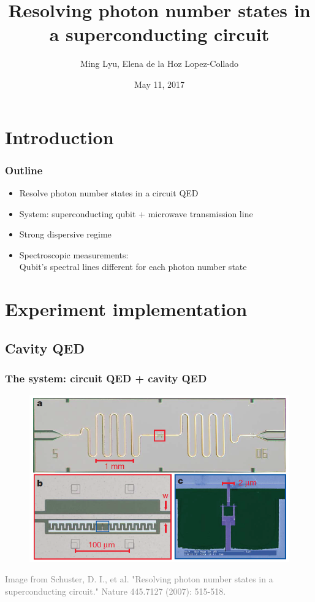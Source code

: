 \documentclass[xcolor=dvipsnames,hyperref={CJKbookmarks=true},aspectratio=169]{beamer}
\title[Nature 445, 515-518]{Resolving photon number states in a superconducting circuit}
\author[Ming, Elena]{Ming Lyu, Elena de la Hoz Lopez-Collado}
\institute[Princeton]{Final projects for ELE456 at Princeton}
\date{May 11, 2017}
\begin{document}
\begin{frame}
\titlepage
\end{frame}
\begin{frame}
    \tableofcontents
\end{frame}

\section{Introduction} 
    


\begin{frame}
\frametitle{Outline}
\begin{itemize}
\item Resolve photon number states in a circuit QED
\vspace{0.3cm}
\item System: superconducting qubit +  microwave transmission line
\vspace{0.3cm}
\item Strong dispersive regime
\vspace{0.3cm}
\item Spectroscopic measurements: \\
Qubit's spectral lines different for each photon number state
\end{itemize}
\end{frame}

\section{Experiment implementation}

\subsection{Cavity QED}
\begin{frame}
\frametitle{The system: circuit QED + cavity QED}
\begin{figure}
\centering
\includegraphics[width=0.7\linewidth]{Circuit.png}
\end{figure}
\tiny{\textcolor{gray}{Image from Schuster, D. I., et al. "Resolving photon number states in a superconducting circuit." Nature 445.7127 (2007): 515-518.\cite{schuster2007resolving}}}
\end{frame}
\end{document}
